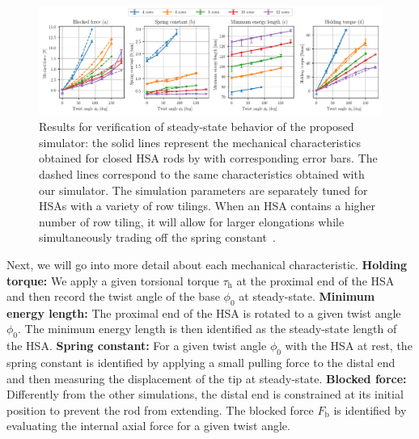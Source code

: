 \begin{figure}[hbt]
    \centering
    \includegraphics[width=\textwidth]{hsamodel/figures/simulation/closed_hsa_rods_verification_v2.pdf}
    \caption{Results for verification of steady-state behavior of the proposed simulator: the solid lines represent the mechanical characteristics obtained for closed \gls{HSA} rods by \citet{good2022expanding} with corresponding error bars. The dashed lines correspond to the same characteristics obtained with our simulator. The simulation parameters are separately tuned for HSAs with a variety of row tilings. When an HSA contains a higher number of row tiling, it will allow for larger elongations while simultaneously trading off the spring constant~\citep{good2022expanding}.}
    \label{fig:hsamodel:closed_hsa_properties_good_et_al}
\end{figure}

Next, we will go into more detail about each mechanical characteristic.
\textbf{Holding torque:} We apply a given torsional torque $\tau_\mathrm{h}$ at the proximal end of the \gls{HSA} and then record the twist angle of the base $\phi_0$ at steady-state.
\textbf{Minimum energy length:} The proximal end of the \gls{HSA} is rotated to a given twist angle $\phi_0$. The minimum energy length is then identified as the steady-state length of the \gls{HSA}.
\textbf{Spring constant:} For a given twist angle $\phi_0$ with the \gls{HSA} at rest, the spring constant is identified by applying a small pulling force to the distal end and then measuring the displacement of the tip at steady-state.
\textbf{Blocked force:} Differently from the other simulations, the distal end is constrained at its initial position to prevent the rod from extending. The blocked force $F_\mathrm{b}$ is identified by evaluating the internal axial force for a given twist angle.



